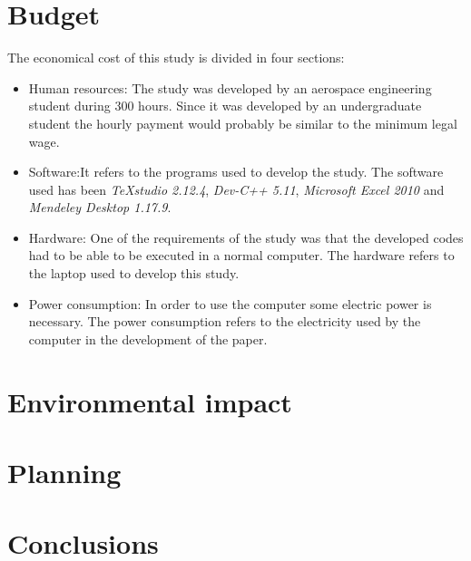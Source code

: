 \chapter{Budget}
The economical cost of this study is divided in four sections:
\begin{itemize}
	\item Human resources: The study was developed by an aerospace engineering student during 300 hours. Since it was developed by an undergraduate student the hourly payment would probably be similar to the minimum legal wage.
	\item Software:It refers to the programs used to develop the study. The software used has been \textit{TeXstudio 2.12.4}, \textit{Dev-C++ 5.11}, \textit{Microsoft Excel 2010} and \textit{Mendeley Desktop 1.17.9}.
	\item Hardware: One of the requirements of the study was that the developed codes had to be able to be executed in a normal computer. The hardware refers to the laptop used to develop this study.
	\item Power consumption: In order to use the computer some electric power is necessary. The power consumption refers to the electricity used by the computer in the development of the paper.
\end{itemize}


\chapter{Environmental impact}


\chapter{Planning}


\chapter{Conclusions}